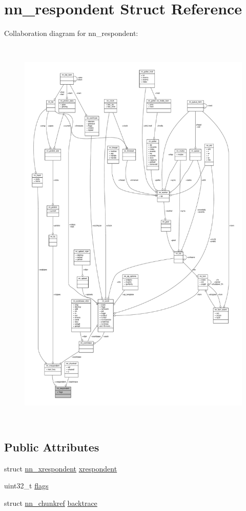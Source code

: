\hypertarget{structnn__respondent}{}\section{nn\+\_\+respondent Struct Reference}
\label{structnn__respondent}


Collaboration diagram for nn\+\_\+respondent\+:\nopagebreak
\begin{figure}[H]
\begin{center}
\leavevmode
\includegraphics[height=550pt]{structnn__respondent__coll__graph}
\end{center}
\end{figure}
\subsection*{Public Attributes}
\begin{DoxyCompactItemize}
\item 
struct \hyperlink{structnn__xrespondent}{nn\+\_\+xrespondent} \hyperlink{structnn__respondent_ac4c692123b8ffc5427d75f7a66666026}{xrespondent}
\item 
uint32\+\_\+t \hyperlink{structnn__respondent_aa7b5f3f38f77166ddd7ab979d2159443}{flags}
\item 
struct \hyperlink{structnn__chunkref}{nn\+\_\+chunkref} \hyperlink{structnn__respondent_acca478c8d55146f2a2a26ab18a4e3e35}{backtrace}
\end{DoxyCompactItemize}



